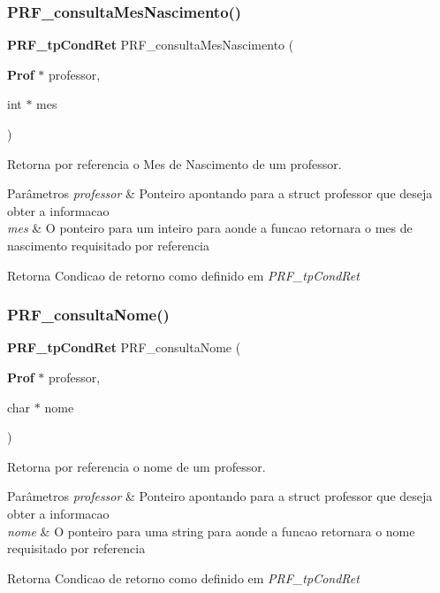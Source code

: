 \subsubsection{P\+R\+F\+\_\+consulta\+Mes\+Nascimento()}
{\footnotesize\ttfamily \textbf{ P\+R\+F\+\_\+tp\+Cond\+Ret} P\+R\+F\+\_\+consulta\+Mes\+Nascimento (\begin{DoxyParamCaption}\item[{\textbf{ Prof} $\ast$}]{professor,  }\item[{int $\ast$}]{mes }\end{DoxyParamCaption})}



Retorna por referencia o Mes de Nascimento de um professor. 


\begin{DoxyParams}{Parâmetros}
{\em professor} & Ponteiro apontando para a struct professor que deseja obter a informacao \\
\hline
{\em mes} & O ponteiro para um inteiro para aonde a funcao retornara o mes de nascimento requisitado por referencia \\
\hline
\end{DoxyParams}
\begin{DoxyReturn}{Retorna}
Condicao de retorno como definido em {\itshape P\+R\+F\+\_\+tp\+Cond\+Ret} 
\end{DoxyReturn}
\mbox{\label{group__modulo_professor_ga30908e7603542d06c05f14208498fd3d}} 
\subsubsection{P\+R\+F\+\_\+consulta\+Nome()}
{\footnotesize\ttfamily \textbf{ P\+R\+F\+\_\+tp\+Cond\+Ret} P\+R\+F\+\_\+consulta\+Nome (\begin{DoxyParamCaption}\item[{\textbf{ Prof} $\ast$}]{professor,  }\item[{char $\ast$}]{nome }\end{DoxyParamCaption})}



Retorna por referencia o nome de um professor. 


\begin{DoxyParams}{Parâmetros}
{\em professor} & Ponteiro apontando para a struct professor que deseja obter a informacao \\
\hline
{\em nome} & O ponteiro para uma string para aonde a funcao retornara o nome requisitado por referencia \\
\hline
\end{DoxyParams}
\begin{DoxyReturn}{Retorna}
Condicao de retorno como definido em {\itshape P\+R\+F\+\_\+tp\+Cond\+Ret} 
\end{DoxyReturn}
\mbox{\label{group__modulo_professor_gae4861c93c873d1372539f5914cd11625}} 

